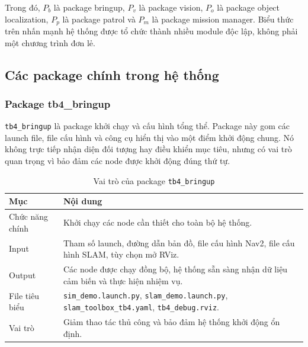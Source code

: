 Trong đó, $P_b$ là package bringup, $P_v$ là package vision, $P_o$ là package object localization, $P_p$ là package patrol và $P_m$ là package mission manager. Biểu thức trên nhấn mạnh hệ thống được tổ chức thành nhiều module độc lập, không phải một chương trình đơn lẻ.

\subsection{Các package chính trong hệ thống}
\label{subsec:main-packages}

\subsubsection{Package tb4\_bringup}
\label{subsubsec:tb4-bringup}

\texttt{tb4\_bringup} là package khởi chạy và cấu hình tổng thể. Package này gom các launch file, file cấu hình và công cụ hiển thị vào một điểm khởi động chung. Nó không trực tiếp nhận diện đối tượng hay điều khiển mục tiêu, nhưng có vai trò quan trọng vì bảo đảm các node được khởi động đúng thứ tự.

\begin{table}[H]
    \centering
    \caption{Vai trò của package \texttt{tb4\_bringup}}
    \label{tab:tb4-bringup}
    \renewcommand{\arraystretch}{1.25}
    \small
    \begin{tabularx}{\textwidth}{|>{\raggedright\arraybackslash}p{}|>{\raggedright\arraybackslash}X|}
        \hline
        \textbf{Mục} & \textbf{Nội dung} \\
        \hline
        Chức năng chính & Khởi chạy các node cần thiết cho toàn bộ hệ thống. \\
        \hline
        Input & Tham số launch, đường dẫn bản đồ, file cấu hình Nav2, file cấu hình SLAM, tùy chọn mở RViz. \\
        \hline
        Output & Các node được chạy đồng bộ, hệ thống sẵn sàng nhận dữ liệu cảm biến và thực hiện nhiệm vụ. \\
        \hline
        File tiêu biểu & \texttt{sim\_demo.launch.py}, \texttt{slam\_demo.launch.py}, \texttt{slam\_toolbox\_tb4.yaml}, \texttt{tb4\_debug.rviz}. \\
        \hline
        Vai trò & Giảm thao tác thủ công và bảo đảm hệ thống khởi động ổn định. \\
        \hline
    \end{tabularx}
\end{table}

